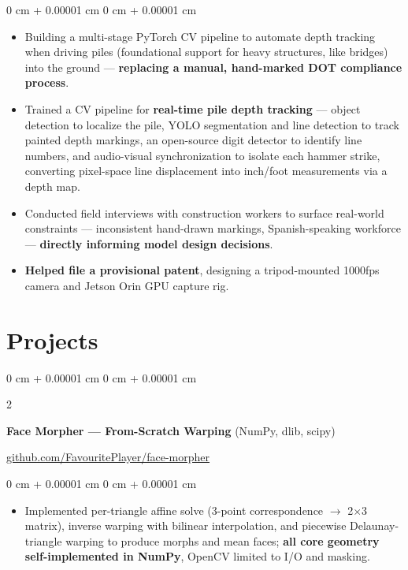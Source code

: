 \documentclass[10pt, letterpaper]{article}
\newenvironment{highlights}{
    \begin{itemize}[
        topsep=0.3 cm,
        parsep=0.05 cm,
        partopsep=0pt,
        itemsep=0.02 cm,
        leftmargin=0 cm + 10pt
    ]
}{
    \end{itemize}
} %
\newenvironment{onecolentry}{
    \begin{adjustwidth}{
        0 cm + 0.00001 cm
    }{
        0 cm + 0.00001 cm
    }
}{
    \end{adjustwidth}
} %
\newenvironment{extendedtwocolentry}[2][]{
    \onecolentry
    \def\secondColumn{#2}
    \setcolumnwidth{\fill, 8 cm}
    \begin{paracol}{2}
}{
    \switchcolumn \raggedleft \secondColumn
    \end{paracol}
    \endonecolentry
}
\begin{document}
        \vspace{0.10 cm}
        \begin{onecolentry}
            \begin{highlights}
                \item Building a multi-stage PyTorch CV pipeline to automate depth tracking when driving piles (foundational support for heavy structures, like bridges) into the ground — \textbf{replacing a manual, hand-marked DOT compliance process}.
                \item Trained a CV pipeline for \textbf{real-time pile depth tracking} — object detection to localize the pile, YOLO segmentation and line detection to track painted depth markings, an open-source digit detector to identify line numbers, and audio-visual synchronization to isolate each hammer strike, converting pixel-space line displacement into inch/foot measurements via a depth map.
                \item Conducted field interviews with construction workers to surface real-world constraints — inconsistent hand-drawn markings, Spanish-speaking workforce — \textbf{directly informing model design decisions}.
                \item \textbf{Helped file a provisional patent}, designing a tripod-mounted 1000fps camera and Jetson Orin GPU capture rig.
            \end{highlights}
        \end{onecolentry}

    \section{Projects}

        \begin{extendedtwocolentry}{
            \href{https://github.com/FavouritePlayer/face-morpher}{github.com/FavouritePlayer/face-morpher}
        }
            \textbf{Face Morpher — From-Scratch Warping} (NumPy, dlib, scipy)
        \end{extendedtwocolentry}

        \vspace{0.10 cm}
        \begin{onecolentry}
            \begin{highlights}
                \item Implemented per-triangle affine solve (3-point correspondence $\rightarrow$ 2$\times$3 matrix), inverse warping with bilinear interpolation, and piecewise Delaunay-triangle warping to produce morphs and mean faces; \textbf{all core geometry self-implemented in NumPy}, OpenCV limited to I/O and masking.
            \end{highlights}
        \end{onecolentry}
\end{document}
